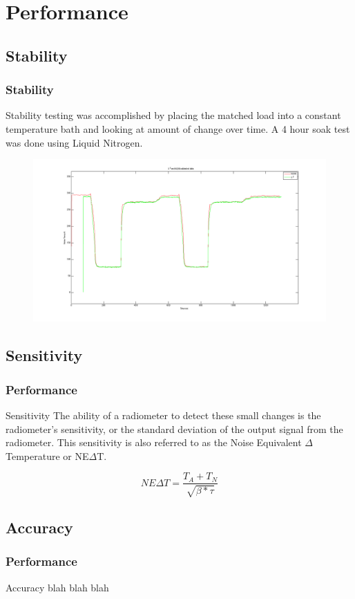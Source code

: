 \documentclass{beamer}
\begin{document}
\section{Performance}
\subsection{Stability}
\begin{frame}
\frametitle{Stability}

Stability testing was accomplished by placing the matched load into a constant temperature bath and looking at amount of change over time.  A 4 hour soak test was done using Liquid Nitrogen.
\begin{figure}\label{money_shot}
\includegraphics[width=1.0\linewidth]{images/lab1_both_calib.png}
\end{figure} 
\end{frame}
\subsection{Sensitivity}
\begin{frame}
\frametitle{Performance}
\begin{block}{Sensitivity}
The ability of a radiometer to detect these small changes is the radiometer's sensitivity, or the standard deviation of the output signal from the radiometer.  This sensitivity is also referred to as the Noise Equivalent $\Delta$ Temperature or NE$\Delta$T. 

\begin{equation}\label{NEAT}
NE\Delta T=\frac{T_{A}+T_{N}}{\sqrt{\beta * \tau}}
\end{equation}
\end{block}
\end{frame}
\subsection{Accuracy}
\begin{frame}
\frametitle{Performance}
\begin{block}{Accuracy}
blah blah blah
\end{block}
\end{frame}
\end{document}
